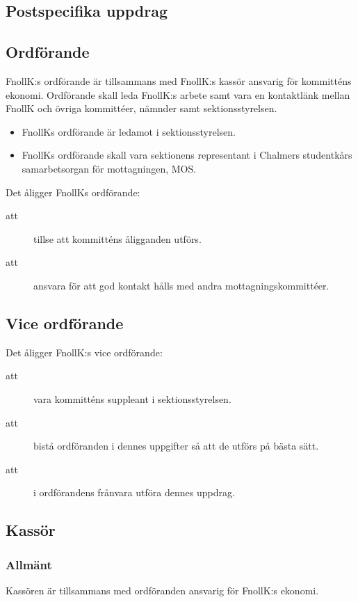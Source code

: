 \documentclass[a4paper]{article}
\begin{document}
\begin{foreningenv}{\forening{}}
    \section{Postspecifika uppdrag}
    \subsection{Ordförande}
    FnollK:s ordförande är tillsammans med FnollK:s kassör ansvarig för kommitténs ekonomi. Ordförande skall leda FnollK:s arbete samt vara en kontaktlänk mellan FnollK och övriga kommittéer, nämnder samt sektionsstyrelsen. 
    \begin{itemize}
        \item FnollKs ordförande är ledamot i sektionsstyrelsen.
        \item FnollKs ordförande skall vara sektionens representant i Chalmers studentkårs samarbetsorgan för mottagningen, MOS.
    \end{itemize}
    Det åligger FnollKs ordförande:
    \begin{description}
        \item[att] tillse att kommitténs åligganden utförs.
        \item[att] ansvara för att god kontakt hålls med andra mottagningskommittéer.
    \end{description}
    
    \subsection{Vice ordförande}
    Det åligger FnollK:s vice ordförande:
    \begin{description}
        \item[att] vara kommitténs suppleant i sektionsstyrelsen.
        \item[att] bistå ordföranden i dennes uppgifter så att de utförs på bästa sätt.
        \item[att] i ordförandens frånvara utföra dennes uppdrag.
    \end{description}
    
    \subsection{Kassör}
    \subsubsection{Allmänt}
    Kassören är tillsammans med ordföranden ansvarig för FnollK:s ekonomi.
    

\end{foreningenv}
\end{document}
